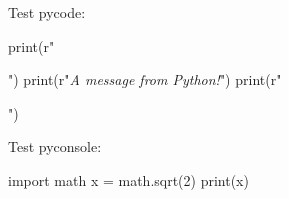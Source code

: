 \documentclass[12pt]{article}
\begin{document}
Test pycode:

\begin{pycode}
print(r"\begin{center}")
print(r"\textit{A message from Python!}")
print(r"\end{center}")
\end{pycode}

Test pyconsole:

\begin{pyconsole}
import math
x = math.sqrt(2)
print(x)
\end{pyconsole}
\end{document}
